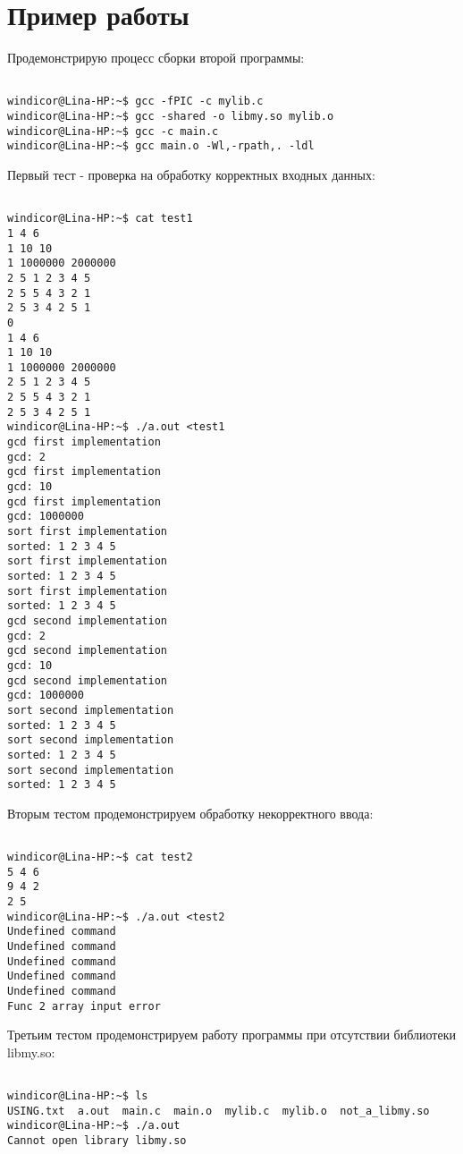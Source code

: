 \section{Пример работы}

Продемонстрирую процесс сборки второй программы:

\begin{verbatim}

windicor@Lina-HP:~$ gcc -fPIC -c mylib.c
windicor@Lina-HP:~$ gcc -shared -o libmy.so mylib.o
windicor@Lina-HP:~$ gcc -c main.c
windicor@Lina-HP:~$ gcc main.o -Wl,-rpath,. -ldl

\end{verbatim}

Первый тест - проверка на обработку корректных входных данных:

\begin{verbatim}

windicor@Lina-HP:~$ cat test1
1 4 6
1 10 10
1 1000000 2000000
2 5 1 2 3 4 5
2 5 5 4 3 2 1
2 5 3 4 2 5 1
0
1 4 6
1 10 10
1 1000000 2000000
2 5 1 2 3 4 5
2 5 5 4 3 2 1
2 5 3 4 2 5 1
windicor@Lina-HP:~$ ./a.out <test1
gcd first implementation
gcd: 2
gcd first implementation
gcd: 10
gcd first implementation
gcd: 1000000
sort first implementation
sorted: 1 2 3 4 5
sort first implementation
sorted: 1 2 3 4 5 
sort first implementation
sorted: 1 2 3 4 5
gcd second implementation
gcd: 2
gcd second implementation
gcd: 10
gcd second implementation
gcd: 1000000
sort second implementation
sorted: 1 2 3 4 5
sort second implementation
sorted: 1 2 3 4 5
sort second implementation
sorted: 1 2 3 4 5

\end{verbatim}

Вторым тестом продемонстрируем обработку некорректного ввода:

\begin{verbatim}

windicor@Lina-HP:~$ cat test2
5 4 6
9 4 2
2 5
windicor@Lina-HP:~$ ./a.out <test2
Undefined command
Undefined command
Undefined command
Undefined command
Undefined command
Func 2 array input error

\end{verbatim}

Третьим тестом продемонстрируем работу программы при отсутствии библиотеки libmy.so:

\begin{verbatim}
    
windicor@Lina-HP:~$ ls
USING.txt  a.out  main.c  main.o  mylib.c  mylib.o  not_a_libmy.so
windicor@Lina-HP:~$ ./a.out 
Cannot open library libmy.so
    
\end{verbatim}

\pagebreak



